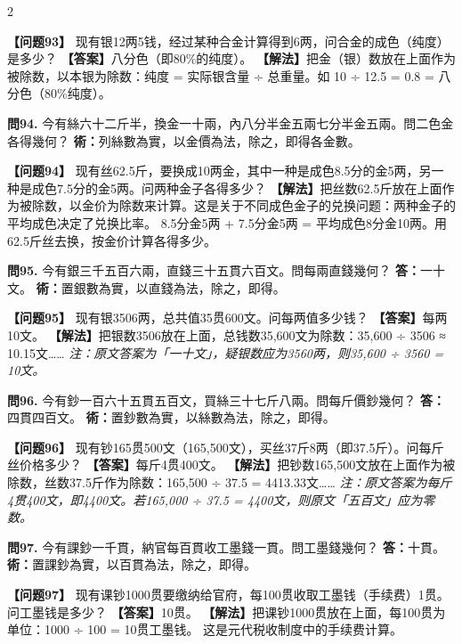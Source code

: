 \documentclass[11pt,a4paper]{article}
\begin{document}
\begin{paracol}{2}
\switchcolumn

\textbf{【问题93】} 现有银12两5钱，经过某种合金计算得到6两，问合金的成色（纯度）是多少？\break
\textbf{【答案】}八分色（即80\%的纯度）。\break
\textbf{【解法】}把金（银）数放在上面作为被除数，以本银为除数：纯度 = 实际银含量 ÷ 总重量。如 10 ÷ 12.5 = 0.8 = 八分色（80\%纯度）。

\switchcolumn*

\textbf{問94.} 今有絲六十二斤半，換金一十兩，內八分半金五兩七分半金五兩。問二色金各得幾何？\break
\textbf{術：}列絲數為實，以金價為法，除之，即得各金數。

\switchcolumn

\textbf{【问题94】} 现有丝62.5斤，要换成10两金，其中一种是成色8.5分的金5两，另一种是成色7.5分的金5两。问两种金子各得多少？\break
\textbf{【解法】}把丝数62.5斤放在上面作为被除数，以金价为除数来计算。这是关于不同成色金子的兑换问题：两种金子的平均成色决定了兑换比率。\break
8.5分金5两 + 7.5分金5两 = 平均成色8分金10两。用62.5斤丝去换，按金价计算各得多少。

\switchcolumn*

\textbf{問95.} 今有銀三千五百六兩，直錢三十五貫六百文。問每兩直錢幾何？\break
\textbf{答：}一十文。\break
\textbf{術：}置銀數為實，以直錢為法，除之，即得。

\switchcolumn

\textbf{【问题95】} 现有银3506两，总共值35贯600文。问每两值多少钱？\break
\textbf{【答案】}每两10文。\break
\textbf{【解法】}把银数3506放在上面，总钱数35,600文为除数：35,600 ÷ 3506 ≈ 10.15文……\break
\textit{注：原文答案为「一十文」，疑银数应为3560两，则35,600 ÷ 3560 = 10文。}

\switchcolumn*

\textbf{問96.} 今有鈔一百六十五貫五百文，買絲三十七斤八兩。問每斤價鈔幾何？\break
\textbf{答：}四貫四百文。\break
\textbf{術：}置鈔數為實，以絲數為法，除之，即得。

\switchcolumn

\textbf{【问题96】} 现有钞165贯500文（165,500文），买丝37斤8两（即37.5斤）。问每斤丝价格多少？\break
\textbf{【答案】}每斤4贯400文。\break
\textbf{【解法】}把钞数165,500文放在上面作为被除数，丝数37.5斤作为除数：165,500 ÷ 37.5 = 4413.33文……\break
\textit{注：原文答案为每斤4贯400文，即4400文。若165,000 ÷ 37.5 = 4400文，则原文「五百文」应为零数。}

\switchcolumn*

\textbf{問97.} 今有課鈔一千貫，納官每百貫收工墨錢一貫。問工墨錢幾何？\break
\textbf{答：}十貫。\break
\textbf{術：}置課鈔為實，以百貫為法，除之，即得。

\switchcolumn

\textbf{【问题97】} 现有课钞1000贯要缴纳给官府，每100贯收取工墨钱（手续费）1贯。问工墨钱是多少？\break
\textbf{【答案】}10贯。\break
\textbf{【解法】}把课钞1000贯放在上面，每100贯为单位：1000 ÷ 100 = 10贯工墨钱。\break
这是元代税收制度中的手续费计算。

\end{paracol}
\end{document}
